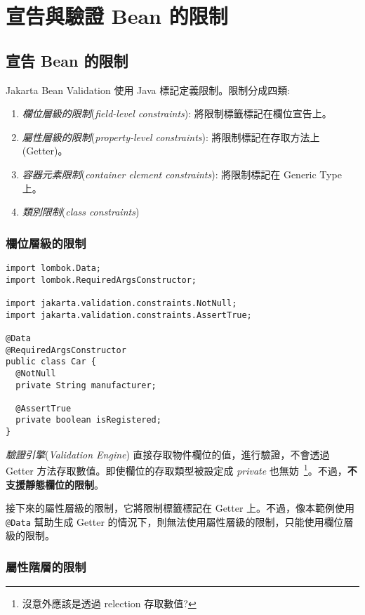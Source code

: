\chapter{宣告與驗證 Bean 的限制}

\section{宣告 Bean 的限制}

Jakarta Bean Validation 使用 Java 標記定義限制。限制分成四類:

\begin{enumerate}
\item \textit{欄位層級的限制}(\textit{field-level constraints}): 將限制標籤標記在欄位宣告上。
\item \textit{屬性層級的限制}(\textit{property-level constraints}): 將限制標記在存取方法上(Getter)。
\item \textit{容器元素限制}(\textit{container element constraints}): 將限制標記在 Generic Type 上。
\item \textit{類別限制}(\textit{class constraints})
\end{enumerate}

\subsection{欄位層級的限制}

\begin{lstlisting}
import lombok.Data;
import lombok.RequiredArgsConstructor;

import jakarta.validation.constraints.NotNull;
import jakarta.validation.constraints.AssertTrue;

@Data
@RequiredArgsConstructor
public class Car {
  @NotNull
  private String manufacturer;

  @AssertTrue
  private boolean isRegistered;
}
\end{lstlisting}

\textit{驗證引擎}(\textit{Validation Engine}) 直接存取物件欄位的值，進行驗證，不會透過 Getter 方法存取數值。即使欄位的存取類型被設定成 \textit{private} 也無妨~\footnote{沒意外應該是透過 relection 存取數值?}。不過，\textbf{不支援靜態欄位的限制}。

接下來的屬性層級的限制，它將限制標籤標記在 Getter 上。不過，像本範例使用 \texttt{@Data} 幫助生成 Getter 的情況下，則無法使用屬性層級的限制，只能使用欄位層級的限制。

\subsection{屬性階層的限制}

